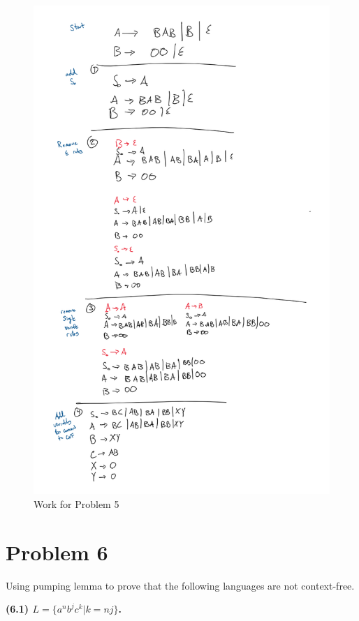 \documentclass[11pt]{article}
\begin{document}
\begin{figure}[h!]
	\centering
	\includegraphics[scale=0.9]{problem5.png} 
	\caption{Work for Problem 5}
\end{figure}

\newpage
\section*{Problem 6}

\noindent
Using pumping lemma to prove that the following languages are not
context-free.

\textbf{(6.1) $L=\{a^nb^jc^k|k=nj\}$.}
\newline
\end{document}
